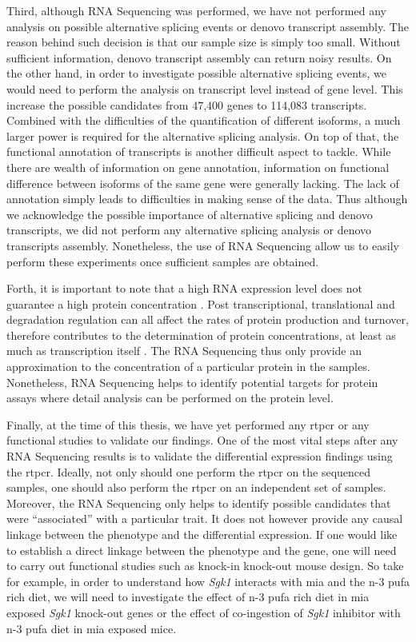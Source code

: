 Third, although RNA Sequencing was performed, we have not performed any analysis on possible alternative splicing events or denovo transcript assembly.
The reason behind such decision is that our sample size is simply too small.
Without sufficient information, denovo transcript assembly can return noisy results.
On the other hand, in order to investigate possible alternative splicing events, we would need to perform the analysis on transcript level instead of gene level. 
This increase the possible candidates from 47,400 genes to 114,083 transcripts.
Combined with the difficulties of the quantification of different isoforms, a much larger power is required for the alternative splicing analysis. 
On top of that, the functional annotation of transcripts is another difficult aspect to tackle.
While there are wealth of information on gene annotation, information on functional difference between isoforms of the same gene were generally lacking. 
The lack of annotation simply leads to difficulties in making sense of the data. 
Thus although we acknowledge the possible importance of alternative splicing and denovo transcripts, we did not perform any alternative splicing analysis or denovo transcripts assembly.
Nonetheless, the use of RNA Sequencing allow us to easily perform these experiments once sufficient samples are obtained.

Forth, it is important to note that a high RNA expression level does not guarantee a high protein concentration \citep{Vogel2012}.
Post transcriptional, translational and degradation regulation can all affect the rates of protein production and turnover, therefore contributes to the determination of protein concentrations, at least as much as transcription itself \citep{Vogel2012}.
The RNA Sequencing thus only provide an approximation to the concentration of a particular protein in the samples.
Nonetheless, RNA Sequencing helps to identify potential targets for protein assays where detail analysis can be performed on the protein level.

Finally, at the time of this thesis, we have yet performed any \gls{rtpcr} or any functional studies to validate our findings.
One of the most vital steps after any RNA Sequencing results is to validate the differential expression findings using the \gls{rtpcr}.
Ideally, not only should one perform the \gls{rtpcr} on the sequenced samples, one should also perform the \gls{rtpcr} on an independent set of samples. 
Moreover, the RNA Sequencing only helps to identify possible candidates that were ``associated'' with a particular trait.
It does not however provide any causal linkage between the phenotype and the differential expression.
If one would like to establish a direct linkage between the phenotype and the gene, one will need to carry out functional studies such as knock-in knock-out mouse design.
So take for example, in order to understand how \textit{Sgk1} interacts with \gls{mia} and the n-3 \gls{pufa} rich diet, we will need to investigate the effect of n-3 \gls{pufa} rich diet in \gls{mia} exposed \textit{Sgk1} knock-out genes or the effect of co-ingestion of \textit{Sgk1} inhibitor with n-3 \gls{pufa} diet in \gls{mia} exposed mice.

